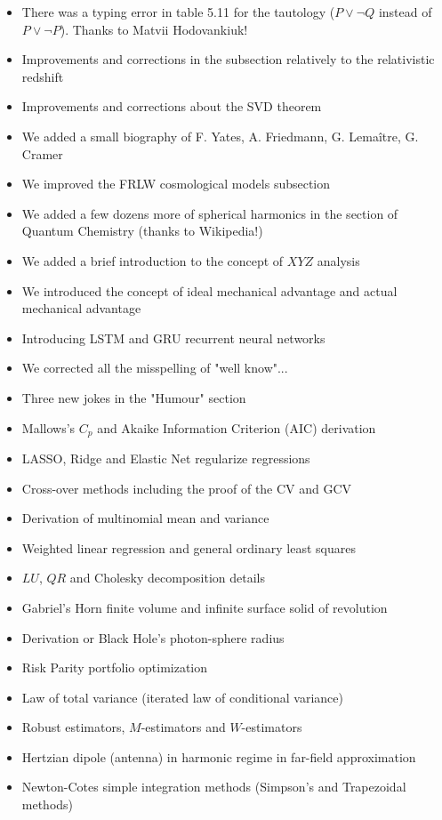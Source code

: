\documentclass[12pt,a4paper,twoside,openright]{report}
\theoremstyle{definition}
\theoremstyle{itexmp}
\numberwithin{equation}{section}
\begin{document}
\begin{itemize}
\begin{itemize}[noitemsep]
			\item There was a typing error in table 5.11 for the tautology ($P \vee \neg Q$ instead of $P \vee \neg P$). Thanks to Matvii Hodovankiuk!
			\item Improvements and corrections in the subsection relatively to the relativistic redshift
			\item Improvements and corrections about the SVD theorem
			\item We added a small biography of F. Yates, A. Friedmann, G. Lemaître, G. Cramer
			\item We improved the FRLW cosmological models subsection
			\item We added a few dozens more of spherical harmonics in the section of Quantum Chemistry (thanks to Wikipedia!)
			\item We added a brief introduction to the concept of $XYZ$ analysis
			\item We introduced the concept of ideal mechanical advantage and actual mechanical advantage
			\item Introducing LSTM and GRU recurrent neural networks
			\item We corrected all the misspelling of "well know"...
			\item Three new jokes in the "Humour" section
			\item Mallows's $C_p$ and Akaike Information Criterion (AIC) derivation
			\item LASSO, Ridge and Elastic Net regularize regressions
			\item Cross-over methods including the proof of the CV and GCV
			\item Derivation of multinomial mean and variance
			\item Weighted linear regression and general ordinary least squares
			\item $LU$, $QR$ and Cholesky decomposition details
			\item Gabriel's Horn finite volume and infinite surface solid of revolution
			\item Derivation or Black Hole's photon-sphere radius
			\item Risk Parity portfolio optimization
			\item Law of total variance (iterated law of conditional variance)
			\item Robust estimators, $M$-estimators and $W$-estimators
			\item Hertzian dipole (antenna) in harmonic regime in far-field approximation
			\item Newton-Cotes simple integration methods (Simpson's and Trapezoidal methods)

\end{itemize}
\end{itemize}
\end{document}
